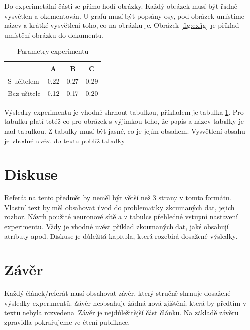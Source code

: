 \documentclass[journal]{IEEEtrancz}
\begin{document}
Do experimetální části se přímo hodí obrázky. Každý obrázek musí být řádně vysvětlen
a okomentován. U grafů musí být popsány osy, pod obrázek umístíme název a 
krátké vysvětlení toho, co na obrázku je. Obrázek \ref{fig:exfig} je příklad
umístění obrázku do dokumentu.

\begin{table}
  \centering
  \caption{Parametry experimentu}
  \begin{tabular}{|l||c|c|c|}
  \hline
    & A & B & C \\
  \hline
  \hline
  S učitelem  & 0.22 & 0.27 & 0.29 \\
  \hline
  Bez učitele & 0.12 & 0.17 & 0.20 \\ 
  \hline
  \end{tabular}
  \label{tab:extab}
\end{table}

Výsledky experimentu je vhodné shrnout tabulkou, příkladem
je tabulka \ref{tab:extab}. Pro tabulku platí totéž co 
pro obrázek s výjimkou toho, že popis a název tabulky je nad tabulkou. Z tabulky
musí být jasné, co je jejím obsahem. Vysvětlení obsahu je vhodné uvést 
do textu poblíž tabulky.

\section{Diskuse}
Referát na tento předmět by neměl být větší než 3 strany v tomto formátu. 
Vlastní text by měl obsahovat úvod do problematiky zkoumaných dat, jejich rozbor. Návrh
použité neuronové sítě a v tabulce přehledné vstupní nastavení experimentu. Vždy je vhodné
uvést příklad zkoumaných dat, jaké obsahují atributy apod. Diskuse je důležitá kapitola,
která rozebírá dosažené výsledky. 

\section{Závěr}
Každý článek/referát musí obsahovat závěr, který stručně shrnuje dosažené výsledky 
experimentů. Závěr neobsahuje žádná nová zjištění, která by předtím v textu nebyla rozvedena.
Závěr je nejdůležitější část článku. Na základě závěru zpravidla pokrařujeme ve čtení
publikace. 
\end{document}

